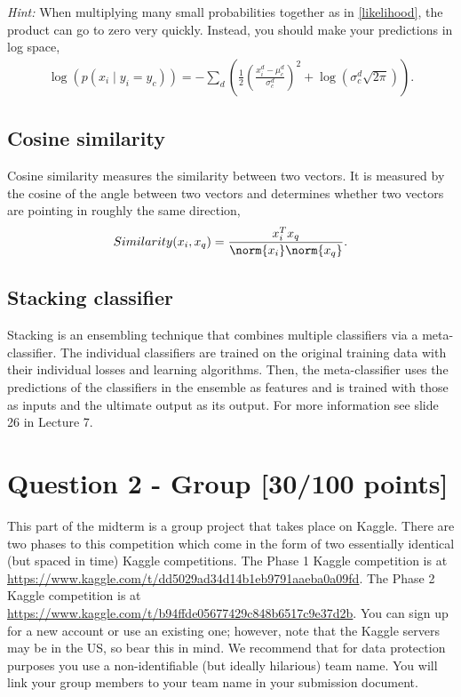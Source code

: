 \emph{Hint:} When multiplying many small probabilities together as in \eqref{likelihood}, the product can go to zero very quickly. Instead, you should make your predictions in log space,
\begin{align}
    \log\left(p(x_i \mid y_i = y_c)\right) = -\sum_{d} \left(\frac{1}{2}\left(\frac{x_i^d - \mu_c^d}{\sigma_c^d}\right)^2 + \log\left( \sigma_c^d \sqrt{2\pi} \right)\right).
\end{align}

\subsection*{Cosine similarity}

Cosine similarity measures the similarity between two vectors. It is measured by the cosine of the angle between two vectors and determines whether two vectors are pointing in roughly the same direction,
\begin{equation}
 Similarity(x_i, x_q)  = \frac{x_{i}^T x_{q}}{\norm{x_{i}}\norm{x_{q}}}.
\end{equation}


\subsection*{Stacking classifier}

 Stacking is an ensembling technique that combines multiple classifiers via a meta-classifier. The individual classifiers are trained on the original training data with their individual losses and learning algorithms. Then, the meta-classifier uses the predictions of the classifiers in the ensemble as features and is trained with those as inputs and the ultimate output as its output. For more information see slide 26 in Lecture 7.
 



\section*{Question 2 - Group \hspace{8.1cm}[30/100 points]}

This part of the midterm is a group project that takes place on Kaggle.  There are two phases to this competition which come in the form of two essentially identical (but spaced in time) Kaggle competitions.  The Phase 1 Kaggle competition is at \url{https://www.kaggle.com/t/dd5029ad34d14b1eb9791aaeba0a09fd}.  The Phase 2 Kaggle competition is at \url{https://www.kaggle.com/t/b94ffde05677429c848b6517c9e37d2b}. You can sign up for a new account or use an existing one; however, note that the Kaggle servers may be in the US, so bear this in mind.  We recommend that for data protection purposes you use a non-identifiable (but ideally hilarious) team name.  You will link your group members to your team name in your submission document.

